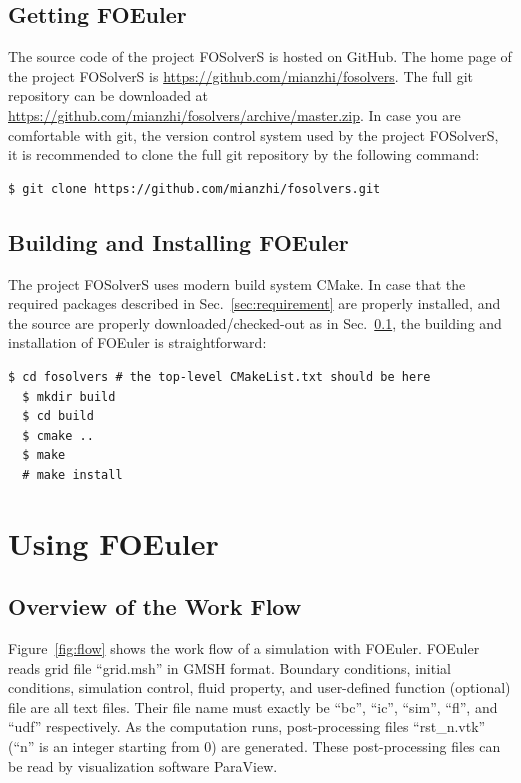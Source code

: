 \documentclass[]{article}
\begin{document}
\subsection{Getting FOEuler}
\label{sec:getting}

The source code of the project FOSolverS is hosted on GitHub.
The home page of the project FOSolverS is \url{https://github.com/mianzhi/fosolvers}.
The full git repository can be downloaded at \\
\url{https://github.com/mianzhi/fosolvers/archive/master.zip}.
In case you are comfortable with git, the version control system used by the project FOSolverS, it
is recommended to clone the full git repository by the following command:
\begin{lstlisting}[backgroundcolor=\color{lightgray}]
  $ git clone https://github.com/mianzhi/fosolvers.git
\end{lstlisting}

\subsection{Building and Installing FOEuler}

The project FOSolverS uses modern build system CMake.
In case that the required packages described in Sec.~\ref{sec:requirement} are properly installed,
and the source are properly downloaded/checked-out as in Sec.~\ref{sec:getting}, the building and
installation of FOEuler is straightforward:
\begin{lstlisting}[backgroundcolor=\color{lightgray}]
  $ cd fosolvers # the top-level CMakeList.txt should be here
  $ mkdir build
  $ cd build
  $ cmake ..
  $ make
  # make install
\end{lstlisting}

\section{Using FOEuler}

\subsection{Overview of the Work Flow}

Figure~\ref{fig:flow} shows the work flow of a simulation with FOEuler.
FOEuler reads grid file ``grid.msh'' in GMSH format.
Boundary conditions, initial conditions, simulation control, fluid property, and user-defined
function (optional) file are all text files.
Their file name must exactly be ``bc'', ``ic'', ``sim'', ``fl'', and ``udf'' respectively.
As the computation runs, post-processing files ``rst\_n.vtk'' (``n'' is an integer starting from 0)
are generated.
These post-processing files can be read by visualization software ParaView.
\end{document}
